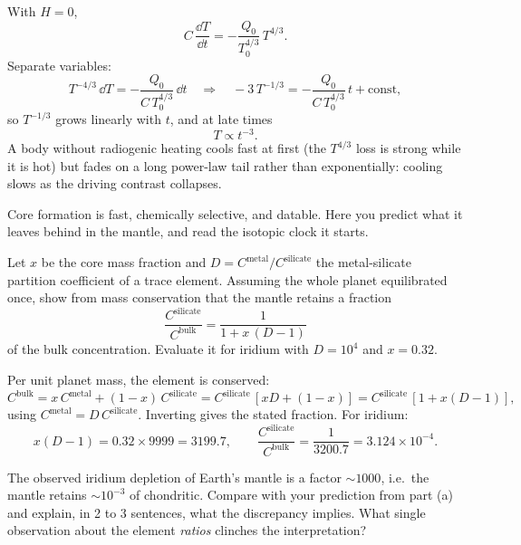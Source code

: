 \begin{solution}
With $H = 0$,
\[
  C\,\frac{\dd T}{\dd t} = -\frac{Q_0}{T_0^{4/3}}\,T^{4/3}.
\]
Separate variables:
\[
  T^{-4/3}\,\dd T = -\frac{Q_0}{C\,T_0^{4/3}}\,\dd t
  \quad\Rightarrow\quad
  -3\,T^{-1/3} = -\frac{Q_0}{C\,T_0^{4/3}}\,t + \mathrm{const},
\]
so $T^{-1/3}$ grows linearly with $t$, and at late times
\[
  T \propto t^{-3}.
\]
A body without radiogenic heating cools fast at first (the $T^{4/3}$ loss is strong while
it is hot) but fades on a long power-law tail rather than exponentially: cooling slows as the
driving contrast collapses.
\end{solution}



Core formation is fast, chemically selective, and datable.
Here you predict what it leaves behind in the mantle, and read the isotopic clock it starts.

\parti Let $x$ be the core mass fraction and $D = C^\mathrm{metal}/C^\mathrm{silicate}$ the
metal-silicate partition coefficient of a trace element. Assuming the whole planet
equilibrated once, show from mass conservation that the mantle retains a fraction
\[
  \frac{C^\mathrm{silicate}}{C^\mathrm{bulk}} = \frac{1}{1 + x\,(D - 1)}
\]
of the bulk concentration. Evaluate it for iridium with $D = 10^{4}$ and $x = 0.32$.

\begin{solution}
Per unit planet mass, the element is conserved:
\[
  C^\mathrm{bulk} = x\,C^\mathrm{metal} + (1 - x)\,C^\mathrm{silicate}
                  = C^\mathrm{silicate}\,\left[x D + (1 - x)\right]
                  = C^\mathrm{silicate}\,\left[1 + x(D - 1)\right],
\]
using $C^\mathrm{metal} = D\,C^\mathrm{silicate}$. Inverting gives the stated fraction. For iridium:
\[
  x(D - 1) = 0.32 \times 9999 = 3199.7,
  \qquad
  \frac{C^\mathrm{silicate}}{C^\mathrm{bulk}} = \frac{1}{3200.7} = 3.124 \times 10^{-4}.
\]
\end{solution}

\parti The observed iridium depletion of Earth's mantle is a factor $\sim 1000$, i.e.\ the
mantle retains $\sim 10^{-3}$ of chondritic. Compare with your prediction from part (a) and
explain, in 2 to 3 sentences, what the discrepancy implies. What single observation about the
element \emph{ratios} clinches the interpretation?

